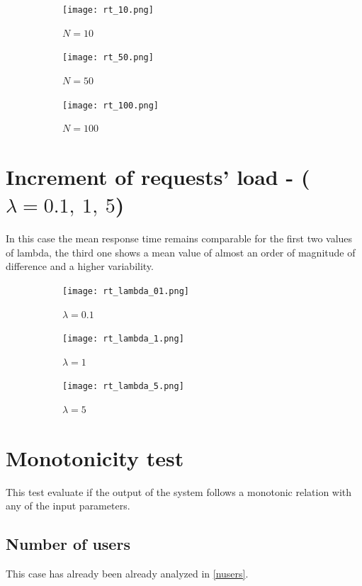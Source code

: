 \documentclass{report}
\begin{document}
\begin{figure}[H]
    \begin{subfigure}{0.55\textwidth}
        \centering
        \texttt{[image: rt\_10.png]}
        \caption{$N=10$}
    \end{subfigure}
    \begin{subfigure}{0.55\textwidth}
        \centering
        \texttt{[image: rt\_50.png]}
        \caption{$N=50$}
        \label{rt_50}
    \end{subfigure}
    \begin{subfigure}{0.55\textwidth}
        \centering
        \texttt{[image: rt\_100.png]}
        \caption{$N=100$}
    \end{subfigure}
    \caption{}
\end{figure}

\section{Increment of requests' load - ($\lambda=0.1,\ 1,\ 5$)}
In this case the mean response time remains comparable for the first two values of lambda, the third one shows a mean value of almost an order of magnitude of difference and a higher variability.

\begin{figure}[H]
    \begin{subfigure}{0.55\textwidth}
        \centering
        \texttt{[image: rt\_lambda\_01.png]}
        \caption{$\lambda = 0.1$}
    \end{subfigure}
    \begin{subfigure}{0.55\textwidth}
        \centering
        \texttt{[image: rt\_lambda\_1.png]}
        \caption{$\lambda = 1$}
        \label{rt_50}
    \end{subfigure}
    \begin{subfigure}{0.55\textwidth}
        \centering
        \texttt{[image: rt\_lambda\_5.png]}
        \caption{$\lambda = 5$}
    \end{subfigure}
    \caption{}
\end{figure}

\section{Monotonicity test}
This test evaluate if the output of the system follows a monotonic relation with any of the input parameters.

\subsection{Number of users}
This case has already been already analyzed in \autoref{nusers}.
\end{document}
